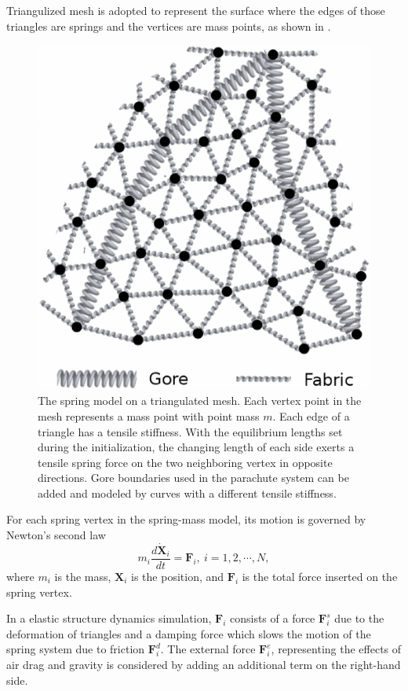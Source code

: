 Triangulized mesh is adopted to represent the surface where the edges of
those triangles are springs and the vertices are mass points, as shown in 
.
\begin{figure}[!ht]
    \centering
    \includegraphics[width=0.6\columnwidth]{figures/goremesh}
    \caption{The spring model on a triangulated mesh. Each vertex point in
    the mesh represents a mass point with point mass $m$. Each edge of a
    triangle has a tensile stiffness. With the equilibrium lengths set during
    the initialization, the changing length of each side exerts a tensile
    spring force on the two neighboring vertex in opposite directions. Gore
    boundaries used in the parachute system can be added and modeled by curves
    with a different tensile stiffness.}
    \label{fig:tri_mesh}
\end{figure}
For each spring vertex in the spring-mass model, its motion is governed by
Newton's second law
\begin{equation}
m_{i} \frac{d\dot{\mathbf{X}}_{i}}{dt} = \mathbf{F}_i,\ i = 1,2,\cdots,N, 
\label{eqn:sm_motion}
\end{equation}
where $m_{i}$ is the mass, $\mathbf{X}_{i}$ is the position,  and
$\mathbf{F}_i$ is the total force inserted on the spring vertex.

In a elastic structure dynamics simulation, $\mathbf{F}_i$ consists of a
force $\mathbf{F}_{i}^{s}$ due to the deformation of triangles and a damping
force which slows the motion of the spring system due to friction
$\mathbf{F}_{i}^{d}$.
The external force $\mathbf{F}_{i}^{e}$, representing the effects of air drag
and gravity is considered by adding an additional term on the right-hand side.

